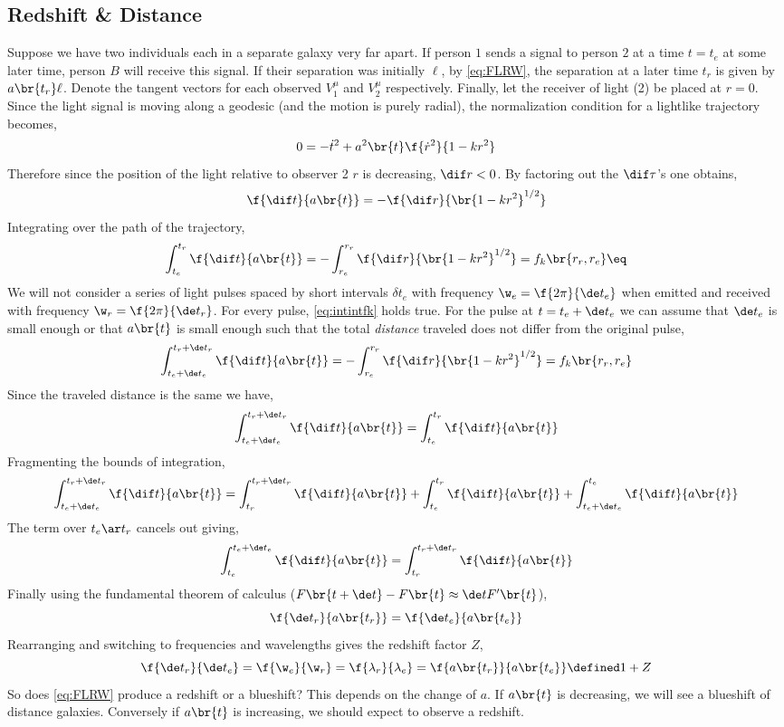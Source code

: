 \documentclass{article}
\begin{document}
\subsection{Redshift \& Distance}
Suppose we have two individuals each in a separate galaxy very far apart. If person $1$ sends a signal to person $2$ at a time $t = t_e$ at some later time, person $B$ will receive this signal. If their separation was initially $\ell$, by \eqref{eq:FLRW}, the separation at a later time $t_r$ is given by $a\br{t_r} \ell$. Denote the tangent vectors for each observed $V^\mu_1$ and $V^\mu_2$ respectively. Finally, let the receiver of light (2) be placed at $r=0$. Since the light signal is moving along a geodesic (and the motion is purely radial), the normalization condition for a lightlike trajectory becomes,
\[ 0 = - \dot{t}^2 + a^2\br{t} \f{\dot{r}^2}{1 - kr^2} \]
Therefore since the position of the light relative to observer 2 $r$ is decreasing, $\dif r < 0$. By factoring out the $\dif \tau$'s one obtains,
\[ \f{\dif t}{a\br{t}} = - \f{\dif r}{\br{1-kr^2}^{1/2}} \]
Integrating over the path of the trajectory,
\[ \int_{t_e}^{t_r} \f{\dif t}{a\br{t}} = - \int_{r_e}^{r_r} \f{\dif r}{\br{1-kr^2}^{1/2}} = f_k \br{r_r, r_e} \eq \label{eq:intintfk}\]
We will not consider a series of light pulses spaced by short intervals $\delta t_e$ with frequency $\w_e = \f{2 \pi }{\de t_e}$ when emitted and received with frequency $\w_r = \f{2 \pi }{\de t_r}$. For every pulse, \eqref{eq:intintfk} holds true. For the pulse at $t = t_e + \de t_e$ we can assume that $\de t_e$ is small enough or that $a\br{t}$ is small enough such that the total \textit{distance} traveled does not differ from the original pulse,
\[ \int_{t_e + \de t_e}^{t_r + \de t_r} \f{\dif t}{a\br{t}} = - \int_{r_e}^{r_r} \f{\dif r}{\br{1-kr^2}^{1/2}} = f_k \br{r_r, r_e} \]
Since the traveled distance is the same we have,
\[ \int_{t_e + \de t_e}^{t_r + \de t_r} \f{\dif t}{a\br{t}} = \int_{t_e}^{t_r} \f{\dif t}{a\br{t}} \]
Fragmenting the bounds of integration,
\[ \int_{t_e + \de t_e}^{t_r + \de t_r} \f{\dif t}{a\br{t}} = \int_{t_r}^{t_r + \de t_r} \f{\dif t}{a\br{t}} + \int_{t_e}^{t_r} \f{\dif t}{a\br{t}} + \int_{t_e + \de t_e}^{t_e} \f{\dif t}{a\br{t}} \]
The term over $t_e \ar t_r$ cancels out giving,
\[ \int_{t_e}^{t_e + \de t_e} \f{\dif t}{a\br{t}} = \int_{t_r }^{t_r + \de t_r} \f{\dif t}{a\br{t}} \]
Finally using the fundamental theorem of calculus ($F\br{t + \de t} - F\br{t} \approx \de t F'\br{t}$),
\[ \f{\de t_r}{a\br{t_r}} = \f{\de t_e}{a\br{t_e}} \]
Rearranging and switching to frequencies and wavelengths gives the redshift factor $Z$,
\[ \f{\de t_r}{\de t_e} = \f{\w_e}{\w_r} = \f{\lambda_r}{\lambda_e} = \f{a\br{t_r}}{a\br{t_e}} \defined 1 + Z \]
So does \eqref{eq:FLRW} produce a redshift or a blueshift? This depends on the change of $a$. If $a\br{t}$ is decreasing, we will see a blueshift of distance galaxies. Conversely if $a\br{t}$ is increasing, we should expect to observe a redshift. \\
\end{document}
